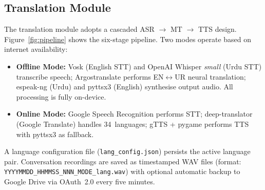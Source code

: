 \documentclass[10pt,twocolumn]{article}
\begin{document}
\subsection{Translation Module}
The translation module adopts a cascaded ASR $\to$ MT $\to$ TTS design.
Figure~\ref{fig:pipeline} shows the six-stage pipeline. Two modes operate
based on internet availability:

\begin{itemize}[leftmargin=*,itemsep=2pt]
  \item \textbf{Offline Mode:} Vosk (English STT) and OpenAI Whisper \textit{small}
        (Urdu STT) transcribe speech; Argostranslate performs EN$\leftrightarrow$UR
        neural translation; espeak-ng (Urdu) and pyttsx3 (English) synthesise output
        audio. All processing is fully on-device.
  \item \textbf{Online Mode:} Google Speech Recognition performs STT;
        deep-translator (Google Translate) handles 34~languages;
        gTTS + pygame performs TTS with pyttsx3 as fallback.
\end{itemize}

A language configuration file (\texttt{lang\_config.json}) persists the active
language pair. Conversation recordings are saved as timestamped WAV files
(format: \texttt{YYYYMMDD\_HHMMSS\_NNN\_MODE\_lang.wav}) with optional automatic
backup to Google Drive via OAuth~2.0 every five minutes.
\end{document}
